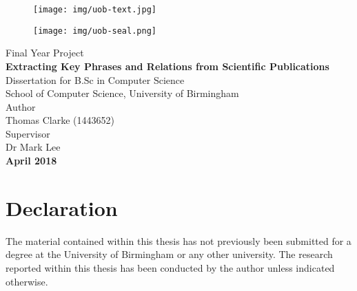 \documentclass{article}
\begin{document}

\begin{titlepage}

\begin{figure}[H]
    \begin{center}
        \texttt{[image: img/uob-text.jpg]}
    \end{center}
\end{figure}
\begin{figure}[H]
    \begin{center}
        \texttt{[image: img/uob-seal.png]}
    \end{center}
\end{figure}


\begin{center}
    \large
    \vspace{.5cm}
    Final Year Project\\
    \vspace{0.5cm}
    \huge
    \textbf{Extracting Key Phrases and Relations from Scientific Publications}\\
    \large
    \vspace{1cm}
    Dissertation for B.Sc in Computer Science\\
    \vspace{.5cm}
    School of Computer Science, University of Birmingham\\
    \vspace{2cm}
    Author\\
    Thomas Clarke (1443652)\\
    \vspace{.5cm}
    Supervisor\\
    Dr Mark Lee\\
    \vspace{2cm}
    \textbf{April 2018}\\
\end{center}
\end{titlepage}


\section*{Declaration}
The material contained within this thesis has not previously been submitted for a degree at the University of Birmingham or any other university. The research reported within this thesis has been conducted by the author unless indicated otherwise.
\end{document}
